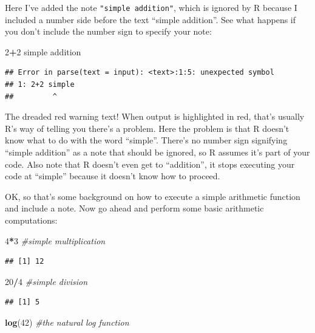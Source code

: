 \documentclass[
]{book}
\newenvironment{Shaded}{\begin{snugshade}}{\end{snugshade}}
\newcommand{\CommentTok}[1]{\textcolor[rgb]{0.56,0.35,0.01}{\textit{#1}}}
\newcommand{\DecValTok}[1]{\textcolor[rgb]{0.00,0.00,0.81}{#1}}
\newcommand{\FunctionTok}[1]{\textcolor[rgb]{0.13,0.29,0.53}{\textbf{#1}}}
\newcommand{\NormalTok}[1]{#1}
\newcommand{\SpecialCharTok}[1]{\textcolor[rgb]{0.81,0.36,0.00}{\textbf{#1}}}
\begin{document}
Here I've added the note \texttt{"simple\ addition"}, which is ignored by R because I included a number side before the text ``simple addition''. See what happens if you don't include the number sign to specify your note:

\begin{Shaded}
\begin{Highlighting}[]
\DecValTok{2}\SpecialCharTok{+}\DecValTok{2}\NormalTok{ simple addition}
\end{Highlighting}
\end{Shaded}

\begin{verbatim}
## Error in parse(text = input): <text>:1:5: unexpected symbol
## 1: 2+2 simple
##         ^
\end{verbatim}

The dreaded red warning text! When output is highlighted in red, that's usually R's way of telling you there's a problem. Here the problem is that R doesn't know what to do with the word ``simple''. There's no number sign signifying ``simple addition'' as a note that should be ignored, so R assumes it's part of your code. Also note that R doesn't even get to ``addition'', it stops executing your code at ``simple'' because it doesn't know how to proceed.

OK, so that's some background on how to execute a simple arithmetic function and include a note. Now go ahead and perform some basic arithmetic computations:

\begin{Shaded}
\begin{Highlighting}[]
\DecValTok{4}\SpecialCharTok{*}\DecValTok{3} \CommentTok{\#simple multiplication}
\end{Highlighting}
\end{Shaded}

\begin{verbatim}
## [1] 12
\end{verbatim}

\begin{Shaded}
\begin{Highlighting}[]
\DecValTok{20}\SpecialCharTok{/}\DecValTok{4} \CommentTok{\#simple division}
\end{Highlighting}
\end{Shaded}

\begin{verbatim}
## [1] 5
\end{verbatim}

\begin{Shaded}
\begin{Highlighting}[]
\FunctionTok{log}\NormalTok{(}\DecValTok{42}\NormalTok{) }\CommentTok{\#the natural log function}
\end{Highlighting}
\end{Shaded}
\end{document}
